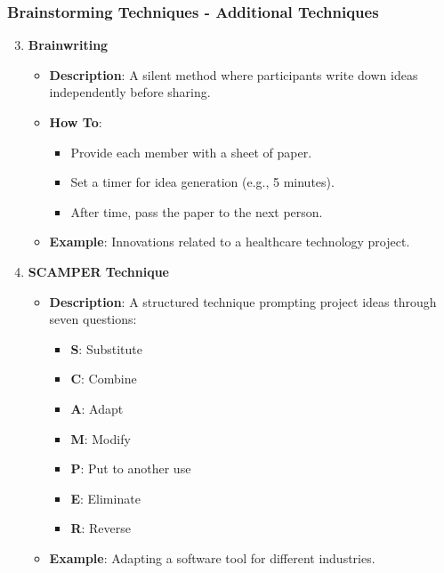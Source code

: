 \documentclass{beamer}
\begin{document}
\begin{frame}[fragile]
    \frametitle{Brainstorming Techniques - Additional Techniques}
    \begin{enumerate}
        \setcounter{enumi}{2}
        \item \textbf{Brainwriting}
        \begin{itemize}
            \item \textbf{Description}: A silent method where participants write down ideas independently before sharing.
            \item \textbf{How To}:
                \begin{itemize}
                    \item Provide each member with a sheet of paper.
                    \item Set a timer for idea generation (e.g., 5 minutes).
                    \item After time, pass the paper to the next person.
                \end{itemize}
            \item \textbf{Example}: Innovations related to a healthcare technology project.
        \end{itemize}

        \item \textbf{SCAMPER Technique}
        \begin{itemize}
            \item \textbf{Description}: A structured technique prompting project ideas through seven questions:
                \begin{itemize}
                    \item {\textbf{S}}: Substitute
                    \item {\textbf{C}}: Combine
                    \item {\textbf{A}}: Adapt
                    \item {\textbf{M}}: Modify
                    \item {\textbf{P}}: Put to another use
                    \item {\textbf{E}}: Eliminate
                    \item {\textbf{R}}: Reverse
                \end{itemize}
            \item \textbf{Example}: Adapting a software tool for different industries.
        \end{itemize}
        

\end{enumerate}
\end{frame}
\end{document}
